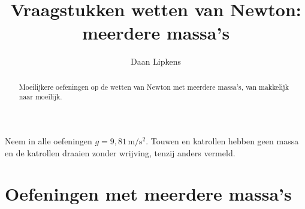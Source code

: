 \documentclass{ximera}
\title{Vraagstukken wetten van Newton: meerdere massa's}
\author{Daan Lipkens}
\begin{document}
\begin{abstract}
    Moeilijkere oefeningen op de wetten van Newton met meerdere massa's, van makkelijk naar moeilijk.
\end{abstract}
\maketitle
Neem in alle oefeningen $g = 9{,}81 \, \mathrm{m/s^2}$. Touwen en katrollen hebben geen massa en de katrollen draaien zonder wrijving, tenzij anders vermeld.
\section{Oefeningen met meerdere massa's}


\end{document}
